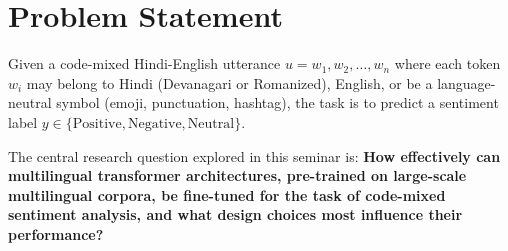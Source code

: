 \section{Problem Statement}

Given a code-mixed Hindi-English utterance $u = w_1, w_2, \ldots, w_n$ where each token $w_i$ may belong to Hindi (Devanagari or Romanized), English, or be a language-neutral symbol (emoji, punctuation, hashtag), the task is to predict a sentiment label $y \in \{\text{Positive}, \text{Negative}, \text{Neutral}\}$.

The central research question explored in this seminar is: \textbf{How effectively can multilingual transformer architectures, pre-trained on large-scale multilingual corpora, be fine-tuned for the task of code-mixed sentiment analysis, and what design choices most influence their performance?}
